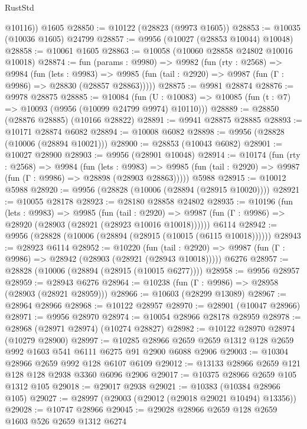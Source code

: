 \begin{lexlean}{RustStd}
\begin{coremodule}
        @10116))
    @1605
@28850 := @10122 (@28823 (@9973 @1605))
@28853 := @10035 (@10036 @1605) @24799
@28857 := @9956 (@10027 (@28853 @10044) @10048)
@28858 := @10061 @1605
@28863 := @10058 (@10060 @28858 @24802 @10016 @10018)
@28874 := fun (params : @9980) =>
  @9982
    (fun (rty : @2568) =>
    @9984
      (fun (lets : @9983) =>
      @9985 (fun (tail : @2920) => @9987 (fun (Γ : @9986) => @28830 (@28857 @28863)))))
@28875 := @9981 @28874
@28876 := @9978 @28875
@28885 := @10084
    (fun (U : @10083) => @10085 (fun (t : @7) => @10093 (@9956 (@10099 @24799 @9974) @10110)))
@28889 := @28850 (@28876 @28885) (@10166 @28822)
@28891 := @9941 @28875 @28885
@28893 := @10171 @28874 @6082
@28894 := @10008 @6082
@28898 := @9956 (@28828 (@10006 (@28894 @10021)))
@28900 := @28853 (@10043 @6082)
@28901 := @10027 @28900
@28903 := @9956 (@28901 @10048)
@28914 := @10174
    (fun (rty : @2568) =>
    @9984
      (fun (lets : @9983) =>
      @9985 (fun (tail : @2920) => @9987 (fun (Γ : @9986) => @28898 (@28903 @28863)))))
    @5988
@28915 := @10012 @5988
@28920 := @9956 (@28828 (@10006 (@28894 (@28915 @10020))))
@28921 := @10055 @28178
@28923 := @28180 @28858 @24802
@28935 := @10196
    (fun (lets : @9983) =>
    @9985
      (fun (tail : @2920) =>
      @9987 (fun (Γ : @9986) => @28920 (@28903 (@28921 (@28923 @10016 @10018))))))
    @6114
@28942 := @9956 (@28828 (@10006 (@28894 (@28915 (@10015 (@6115 @10018))))))
@28943 := @28923 @6114
@28952 := @10220
    (fun (tail : @2920) => @9987 (fun (Γ : @9986) => @28942 (@28903 (@28921 (@28943 @10018)))))
    @6276
@28957 := @28828 (@10006 (@28894 (@28915 (@10015 @6277))))
@28958 := @9956 @28957
@28959 := @28943 @6276
@28964 := @10238 (fun (Γ : @9986) => @28958 (@28903 (@28921 @28959)))
@28966 := @10603 (@28299 @13089)
@28967 := @28964 @28966
@28968 := @10122 @28957
@28970 := @28901 (@10047 @28966)
@28971 := @9956 @28970
@28974 := @10054 @28966 @28178 @28959
@28978 := @28968 (@28971 @28974) (@10274 @28827)
@28982 := @10122 @28970 @28974 (@10279 @28900)
@28997 := @10285
    @28966
    @2659
    @2659
    @1312
    @128
    @2659
    @992
    @1603
    @541
    @6111
    @6275
    @91
    @2900
    @6088
    @2906
@29003 := @10304 @28966 @2659 @992 @128 @6107 @6109
@29012 := @13133 @28966 @2659 @121 @128 @128 @2938 @3360 @6096 @2906
@29017 := @10375 @28966 @2659 @105 @1312 @105
@29018 := @29017 @2938
@29021 := @10383 (@10384 @28966 @105)
@29027 := @28997 (@29003 (@29012 (@29018 @29021 @10494) @13356))
@29028 := @10747 @28966
@29045 := @29028
    @28966
    @2659
    @128
    @2659
    @1603
    @526
    @2659
    @1312
    @6274

\end{coremodule}
\end{lexlean}
